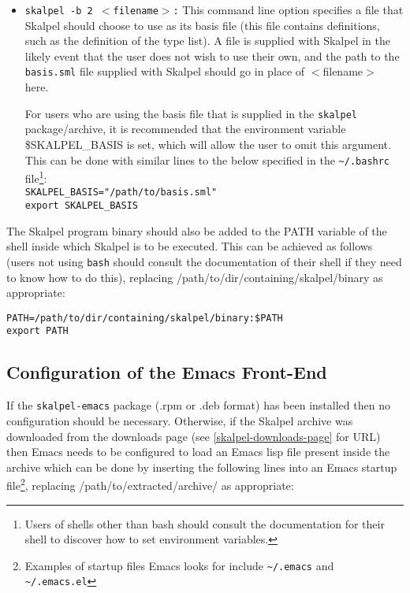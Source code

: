 \documentclass{report}
\begin{document}
\begin{itemize}
\item \texttt{skalpel -b 2 $<$filename$>$:} This command line option
  specifies a file that Skalpel should choose to use as its
  basis file (this file contains definitions, such as the definition of the
  type list). A file is supplied with Skalpel in the likely event that the
  user does not wish to use their own, and the path to the
  \texttt{basis.sml} file supplied with Skalpel should go in place of
  $<$filename$>$ here.

  For users who are using the basis file that is supplied in the
  \texttt{skalpel} package/archive, it is recommended that the
  environment variable \$SKALPEL\_BASIS is set, which will allow the
  user to omit this argument. This can be done with similar lines to
  the below specified in the \texttt{{\textasciitilde}/.bashrc} file\footnote{ Users of shells
    other than bash should consult the documentation for their shell
    to discover how to set environment variables.}:\\

  \texttt{SKALPEL\_BASIS="/path/to/basis.sml"}\\
  \texttt{export SKALPEL\_BASIS}

\end{itemize}

The Skalpel program binary should also be added to the PATH variable
of the shell inside which Skalpel is to be executed. This can be
achieved as follows (users not using \texttt{bash} should consult the
documentation of their shell if they need to know how to do this),
replacing /path/to/dir/containing/skalpel/binary as appropriate:

\noindent \texttt{PATH=/path/to/dir/containing/skalpel/binary:\$PATH}\\
\texttt{export PATH}

\subsection{Configuration of the Emacs Front-End}

If the \texttt{skalpel-emacs} package (.rpm or .deb format) has been
installed then no configuration should be necessary. Otherwise, if the
Skalpel archive was downloaded from the downloads page (see
\ref{skalpel-downloads-page} for URL) then Emacs needs to be
configured to load an Emacs lisp file present inside the archive which
can be done by inserting the following lines into an Emacs startup
file\footnote{ Examples of startup files Emacs looks for include
  \texttt{{\textasciitilde}/.emacs} and
  \texttt{{\textasciitilde}/.emacs.el}}, replacing
/path/to/extracted/archive/ as appropriate:
\end{document}
